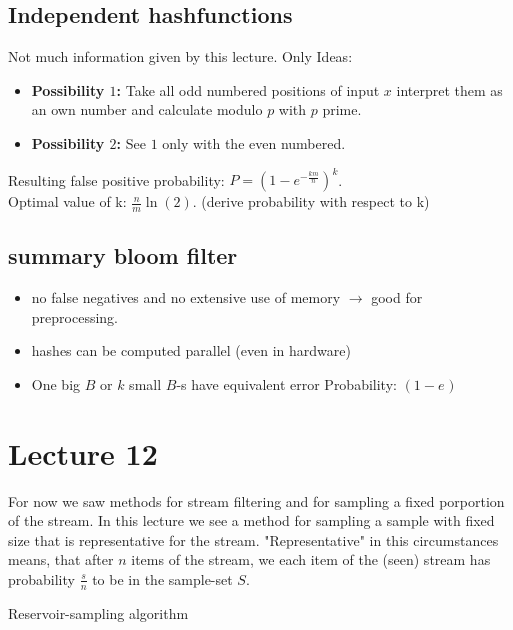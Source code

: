 \documentclass[]{article}
\begin{document}
\subsection{Independent hashfunctions}
Not much information given by this lecture. Only Ideas:
\begin{itemize}
\item \textbf{Possibility $1$:} Take all odd numbered positions of input $x$ interpret them as an own number and calculate modulo $p$ with $p$ prime.
\item \textbf{Possibility $2$:} See $1$ only with the even numbered.
\end{itemize}

Resulting false positive probability: $P = (1- e^{-\frac{km}{n}})^k$.\\
Optimal value of k: $\frac{n}{m} \ln(2)$. (derive probability with respect to k)

\subsection{summary bloom filter}
\begin{itemize}
\item no false negatives and no extensive use of memory $\rightarrow$ good for preprocessing.
\item hashes can be computed parallel (even in hardware)
\item One big $B$ or $k$ small $B$-s have equivalent error Probability: $(1-e^{}) $ %
\end{itemize}

\section{Lecture 12}
For now we saw methods for stream filtering and for sampling a fixed porportion of the stream. 
In this lecture we see a method for sampling a sample with fixed size that is representative for the stream. "Representative" in this circumstances means, that after $n$ items of the stream, we each item of the (seen) stream has probability $\frac{s}{n}$ to be in the sample-set $S$.

\begin{algorithm}
\caption{Reservoir-sampling algorithm}
\label{reservoir-sampling}
\begin{algorithmic}
\Require 
\end{algorithmic}
\end{algorithm}
\end{document}
